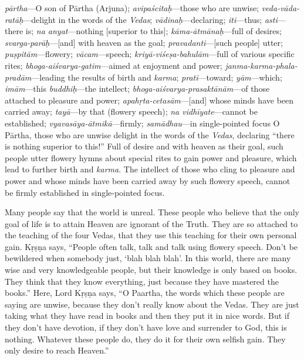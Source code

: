 {%
  \textit{pārtha}---O son of Pārtha (Arjuna); 
  \textit{avipaścitaḥ}---those who are unwise; 
  \textit{veda-vāda-ratāḥ}---delight in the words of the \textit{Vedas}; 
  \textit{vādinaḥ}---declaring; 
  \textit{iti}---thus; 
  \textit{asti}---there is; 
  \textit{na anyat}---nothing [superior to this]; 
  \textit{kāma-ātmānaḥ}---full of desires; 
  \textit{svarga-parāḥ}---[and] with heaven as the goal; 
  \textit{pravadanti}---[such people] utter; 
  \textit{puṣpitām}---flowery; 
  \textit{vācam}---speech; 
  \textit{kriyā-viśeṣa-bahulām}---full of various specific rites; 
  \textit{bhoga-aiśvarya-gatim}---aimed at enjoyment and power; 
  \textit{janma-karma-phala-pradām}---leading the results of birth and \textit{karma}; 
  \textit{prati}---toward; 
  \textit{yām}---which; 
  \textit{imām}---this
  \textit{buddhiḥ}---the intellect; 
  \textit{bhoga-aiśvarya-prasaktānām}---of those attached to pleasure and power; 
  \textit{apahṛta-cetasām}---[and] whose minds have been carried away; 
  \textit{tayā}---by that (flowery speech); 
  \textit{na vidhīyate}---cannot be established; 
  \textit{vyavasāya-ātmikā}---firmly; 
  \textit{samādhau}---in single-pointed focus
}
{%
  O Pārtha, those who are unwise delight in the words of the \textit{Vedas}, declaring \enquote{there is nothing superior to this!} Full of desire and with heaven as their goal, such people utter flowery hymns about special rites to gain power and pleasure, which lead to further birth and \textit{karma}. The intellect of those who cling to pleasure and power and whose minds have been carried away by such flowery speech, cannot be firmly established in single-pointed focus.
}

Many people say that the world is unreal. These people who believe that the only goal of life is to attain Heaven are ignorant of the Truth. They are so attached to the teaching of the four Vedas, that they use this teaching for their own personal gain. Kṛṣṇa says, “People often talk, talk and talk using flowery speech. Don’t be bewildered when somebody just, ‘blah blah blah’. In this world, there are many wise and very knowledgeable people, but their knowledge is only based on books. They think that they know everything, just because they have mastered the books.” Here, Lord Kṛṣṇa says, “O Paartha, the words which these people are saying are unwise, because they don’t really know about the Vedas. They are just taking what they have read in books and then they put it in nice words. But if they don’t have devotion, if they don’t have love and surrender to God, this is nothing. Whatever these people do, they do it for their own selfish gain. They only desire to reach Heaven.”

